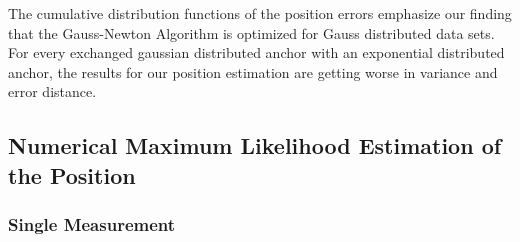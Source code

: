 \documentclass{article}
\begin{document}
\begin{itemize}
        The cumulative distribution functions of the position errors emphasize our finding that the Gauss-Newton Algorithm is optimized for Gauss distributed data sets. For every exchanged gaussian distributed anchor with an exponential distributed anchor, the results for our position estimation are getting worse in variance and error distance.\\

\end{itemize}


\subsection{Numerical Maximum Likelihood Estimation of the Position}
\subsubsection{Single Measurement}
\end{document}
